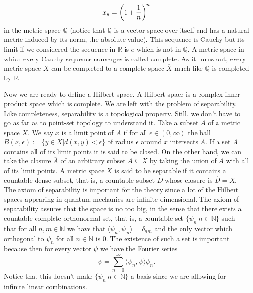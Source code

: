 \documentclass{article}
\begin{document}
\begin{equation}
x_n=\qty(1+\frac{1}{n})^n
\end{equation}
in the metric space $\mathbb{Q}$ (notice that $\mathbb{Q}$ is a vector space over itself and has a natural metric induced by its norm, the absolute value). This sequence is Cauchy but its limit if we considered the sequence in $\mathbb{R}$ is $e$ which is not in $\mathbb{Q}$. A metric space in which every Cauchy sequence converges is called complete. As it turns out, every metric space $X$ can be completed to a complete space $\overline{X}$ much like $\mathbb{Q}$ is completed by $\mathbb{R}$.

Now we are ready to define a Hilbert space. A Hilbert space is a complex inner product space which is complete. We are left with the problem of separability. Like completeness, separability is a topological property. Still, we don't have to go as far as to point-set topology to understand it. Take a subset $A$ of a metric space $X$. We say $x$ is a limit point of $A$ if for all $\epsilon\in (0,\infty)$ the ball $B(x,\epsilon):=\{y\in X|d(x,y)<\epsilon\}$ of radius $\epsilon$ around $x$ intersects $A$. If a set $A$ contains all of its limit points it is said to be closed. On the other hand, we can take the closure $\overline{A}$ of an arbitrary subset $A\subseteq X$ by taking the union of $A$ with all of its limit points. A metric space $X$ is said to be separable if it contains a countable dense subset, that is, a countable subset $D$ whose closure is $\overline{D}=X$. The axiom of separability is important for the theory since a lot of the Hilbert spaces appearing in quantum mechanics are infinite dimensional. The axiom of separability assures that the space is no too big, in the sense that there exists a countable complete orthonormal set, that is, a countable set $\{\psi_n|n\in\mathbb{N}\}$ such that for all $n,m\in\mathbb{N}$ we have that $\langle\psi_n,\psi_m\rangle=\delta_{nm}$ and the only vector which orthogonal to $\psi_n$ for all $n\in\mathbb{N}$ is $0$. The existence of such a set is important because then for every vector $\psi$ we have the Fourier series
\begin{equation}
\psi=\sum_{n=0}^\infty \langle \psi_n,\psi\rangle \psi_n.
\end{equation}
Notice that this doesn't make $\{\psi_n|n\in\mathbb{N}\}$ a basis since we are allowing for infinite linear combinations\cite{Hewitt1975}.
\end{document}
